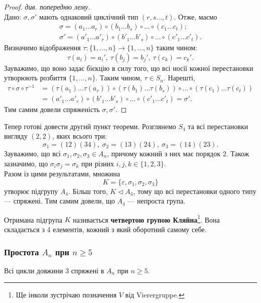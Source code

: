 \documentclass{math_library}
\begin{document}
\begin{proof}
\rightproof \textit{див. попередню лему.}
\bigskip \\
\leftproof Дано: $\sigma,\sigma'$ мають однаковий циклічний тип $(r,s\dots,t)$. Отже, маємо
\begin{align*}
\sigma = (a_1 \dots a_r) \circ (b_1 \dots b_s) \circ \dots \circ (c_1 \dots c_t); \\
\sigma' = (a'_1 \dots a'_r) \circ (b'_1 \dots b'_s) \circ \dots \circ (c'_1 \dots c'_t).
\end{align*}
Визначимо відображення $\tau \colon \{1,\dots,n\} \to \{1,\dots,n\}$ таким чином:
\[ 
\tau(a_i) = a_i',\ \tau(b_j) = b_j',\ \tau(c_k) = c_k'.
\]
Зауважимо, що воно задає бієкцію в силу того, що всі носії кожної перестановки утворюють розбиття $\{1,\dots,n\}$. Таким чином, $\tau \in S_n$. Нарешті,
\begin{align*}
\tau \circ \sigma \circ \tau^{-1} & = (\tau(a_1)\dots \tau(a_r)) \circ (\tau(b_1)\dots \tau(b_s)) \circ \dots \circ (\tau(c_1)\dots \tau(c_t)) \\ 
& = (a'_1 \dots a'_r) \circ (b'_1 \dots b'_s) \circ \dots \circ (c'_1 \dots c'_t) = \sigma'.
\end{align*}
Тим самим довели спряженість $\sigma,\sigma'$.
\end{proof}

Тепер готові довести другий пункт теореми. Розглянемо $S_4$ та всі перестановки вигляду $(2,2)$, яких всього три: 
\[
\sigma_1 = (12)(34),\ \sigma_2 = (13)(24),\ \sigma_3 = (14)(23).
\]
Зауважимо, що всі $\sigma_1,\sigma_2,\sigma_3 \in A_n$, причому кожний з них має порядок $2$. Також зазначимо, що $\sigma_i \sigma_j = \sigma_k$ при різних $i,j,k \in \{1,2,3\}$.\\
Разом із цими результатами, множина 
\[
K = \{\varepsilon,\sigma_1,\sigma_2,\sigma_3\}
\]
утворює підгрупу $A_4$. Більш того, $K \triangleleft A_4$, тому що всі перестановки одного типу --- спряжені. Тим самим довели, що $A_4$ --- непроста група.

\begin{definition}
Отримана підгрупа $K$ називається \textbf{четвертою групою Кляйна}\footnote{Ще інколи зустрічаю позначення $V$ від Vierergruppe.}. Вона складається з 4 елементів, кожний з який оборотний самому себе.
\end{definition}

\subsubsection{Простота $A_n$ при $n \geq 5$}
\begin{lemma}
Всі цикли довжини $3$ спряжені в $A_n$ при $n \geq 5$.
\end{lemma}
\end{document}
